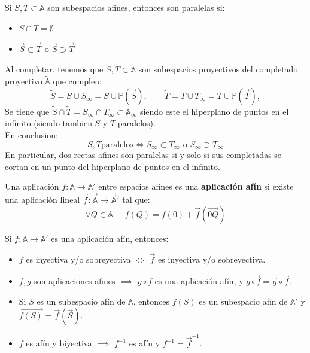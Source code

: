 \begin{observación}
    Si $S,T \subset \mathbb{A}$ son subespacios afines, entonces son paralelas si:
    \begin{itemize}
        \item $S \cap T = \emptyset$
        \item $\vec{S} \subset \vec{T}$ o $\vec{S} \supset \vec{T}$
    \end{itemize}
    Al completar, tenemos que $\widetilde{S}, \widetilde{T} \subset \widetilde{\mathbb{A}}$ son subespacios proyectivos del completado proyectivo $\widetilde{\mathbb{A}}$ que cumplen:
    \[
    \widetilde{S} = S \cup S_{\infty} = S \cup \mathbb{P}(\vec{S}), \qquad
    \widetilde{T} = T \cup T_{\infty} = T \cup \mathbb{P}(\vec{T}),
    \]
    Se tiene que $\widetilde{S} \cap \widetilde{T} = S_{\infty} \cap T_{\infty} \subset \mathbb{A}_{\infty}$ siendo este el hiperplano de puntos en el infinito (siendo tambien $S$ y $T$ paralelos).\\
    En conclusion:
    \[
    S, T \text{paralelos} \iff
    S_{\infty} \subset T_{\infty} \text{ o } S_{\infty} \supset T_{\infty}  
    \]
    En particular, dos rectas afines son paralelas si y solo si sus completadas se cortan en un punto del hiperplano de puntos en el infinito.
\end{observación}

\begin{definición}
    Una aplicación $f: \mathbb{A} \to \mathbb{A}'$ entre espacios afines es una \textbf{aplicación afín} si existe una aplicación lineal $\vec{f}: \vec{\mathbb{A}} \to \vec{\mathbb{A}}'$ tal que:
    \[
    \forall Q \in \mathbb{A}: \quad f(Q) = f(0) + \vec{f}(\overrightarrow{0Q})
    \]
\end{definición}

\begin{proposición}
    Si $f: \mathbb{A} \to \mathbb{A}'$ es una aplicación afín, entonces:
    \begin{itemize}
        \item $f$ es inyectiva y/o sobreyectiva $\iff$ $\vec{f}$ es inyectiva y/o sobreyectiva.
        \item $f,g$ son aplicaciones afines $\implies$ $g \circ f$ es una aplicación afín, y $\vec{g \circ f} = \vec{g} \circ \vec{f}$.
        \item Si $S$ es un subespacio afín de $\mathbb{A}$, entonces $f(S)$ es un subespacio afín de $\mathbb{A}'$ y $\vec{f(S)} = \vec{f}(\vec{S})$.
        \item $f$ es afín y biyectiva $\implies$ $f^{-1}$ es afín y $\vec{f^{-1}} = \vec{f}^{-1}$.
    \end{itemize}
\end{proposición}


